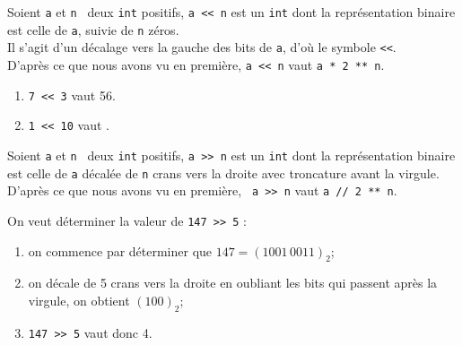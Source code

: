 \documentclass[a4paper,10pt,cours,firamath]{nsi}
\begin{document}
\begin{definition}[ : opérateur <<]
	Soient \texttt{a} et \texttt{n } deux \texttt{int} positifs, \texttt{a << n} est un \texttt{int} dont la représentation binaire est celle de \texttt{a}, suivie de \texttt{n} zéros.\\
	Il s'agit d'un décalage vers la gauche des bits de \texttt{a}, d'où le symbole \texttt{<<}.\\
	D'après ce que nous avons vu en première, \texttt{a << n} vaut \texttt{a * 2 ** n}.
\end{definition}

\begin{exemple}[s]
	\begin{enumerate}
		\item 	\texttt{7 << 3} vaut 56.
		\item 	\texttt{1 << 10} vaut .
	\end{enumerate}
\end{exemple}

\begin{definition}[ : opérateur >>]
	Soient \texttt{a} et \texttt{n } deux \texttt{int} positifs, \texttt{a >> n} est un \texttt{int} dont la représentation binaire est celle de \texttt{a} décalée de \texttt{n} crans vers la droite avec troncature avant la virgule.
	D'après ce que nous avons vu en première, \texttt{ a >> n} vaut \texttt{a // 2 ** n}.
\end{definition}

\begin{exemple}[]
	On veut déterminer la valeur de \texttt{147 >> 5} :
	\begin{enumerate}
		\item 	on commence par déterminer que $147=(1001\,0011)_2$;
		\item 	on décale de 5 crans vers la droite en oubliant les bits qui passent après la virgule, on obtient $(100)_2$;
		\item 	\texttt{147 >> 5} vaut donc 4.
	\end{enumerate}
\end{exemple}
\end{document}
